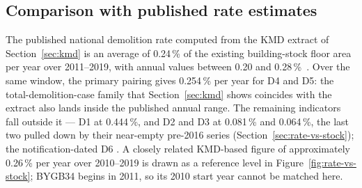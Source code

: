 \subsection{Comparison with published rate estimates}\label{sec:build-comparison}
The published national demolition rate computed from the KMD extract of
Section~\ref{sec:kmd} is an average of 0.24\,\% of the existing
building-stock floor area per year over 2011--2019, with annual values
between 0.20 and 0.28\,\%~\cite{andersen2022adaptation}. Over the same
window, the primary pairing gives 0.254\,\% per year for D4 and D5: the
total-demolition-case family that Section~\ref{sec:kmd} shows coincides
with the extract also lands inside the published annual range. The
remaining indicators fall outside it --- D1 at 0.444\,\%, and D2 and D3 at
0.081\,\% and 0.064\,\%, the last two pulled down by their near-empty
pre-2016 series (Section~\ref{sec:rate-vs-stock}); the notification-dated
D6 . A closely related KMD-based figure of
approximately 0.26\,\% per year over 2010--2019  is drawn as a
reference level in Figure~\ref{fig:rate-vs-stock}; BYGB34 begins in
2011, so its 2010 start year cannot be matched here.

